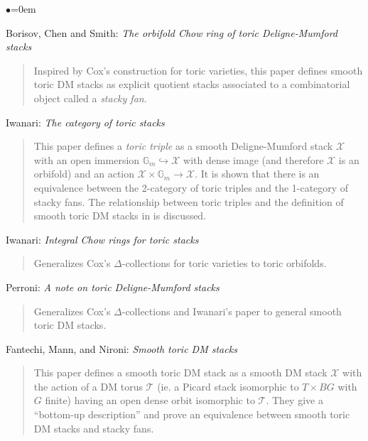\begin{list}{$\bullet$}{\leftmargin=0em}

\smallskip

\item Borisov, Chen and Smith: \emph{The orbifold Chow ring of toric
Deligne-Mumford stacks} \cite{bcs}
\begin{quote}
Inspired by Cox's construction for toric varieties, this paper defines
smooth toric DM stacks as explicit quotient stacks associated to a
combinatorial object called a \emph{stacky fan}.
\end{quote}
\smallskip 

\item Iwanari: \emph{The category of toric stacks} \cite{iwanari_toric}
\begin{quote}
This paper defines a \emph{toric triple} as a smooth Deligne-Mumford stack
$\mathcal{X}$ with an open immersion $\mathbb{G}_m \hookrightarrow \mathcal{X}$
with dense image (and therefore $\mathcal{X}$ is an orbifold) and an action
$\mathcal{X} \times \mathbb{G}_m \rightarrow \mathcal{X}$.  It is shown that
there is an equivalence between the 2-category of toric triples and the
1-category of stacky fans.  The relationship between toric triples and the
definition of smooth toric DM stacks in \cite{bcs} is discussed.
\end{quote}
\smallskip

\item Iwanari: \emph{Integral Chow rings for toric stacks}
\cite{iwanari_chow}
\begin{quote}
Generalizes Cox's $\Delta$-collections for toric varieties to toric orbifolds.  
\end{quote}
\smallskip

\item Perroni: \emph{A note on toric Deligne-Mumford stacks}
\cite{perroni}
\begin{quote}
Generalizes Cox's $\Delta$-collections and Iwanari's paper
\cite{iwanari_chow} to general smooth toric DM stacks.
\end{quote}
\smallskip

\item Fantechi, Mann, and Nironi:  \emph{Smooth toric DM stacks}
\cite{fmn}
\begin{quote}
This paper defines a smooth toric DM stack as a smooth DM stack
$\mathcal{X}$ with the action of a DM torus $\mathcal{T}$ (ie. a Picard
stack isomorphic to  $T \times BG$ with $G$ finite) having an open dense
orbit isomorphic to $\mathcal{T}$.  They give a ``bottom-up description''
and prove an equivalence between smooth toric DM stacks and stacky fans.
\end{quote}
\end{list}



